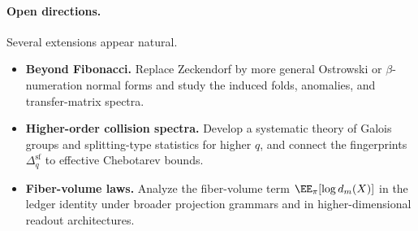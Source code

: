 \paragraph{Open directions.}
Several extensions appear natural.
\begin{itemize}[leftmargin=2.2em]
\item \textbf{Beyond Fibonacci.} Replace Zeckendorf by more general Ostrowski or \(\beta\)-numeration normal forms and study the induced folds, anomalies, and transfer-matrix spectra.
\item \textbf{Higher-order collision spectra.} Develop a systematic theory of Galois groups and splitting-type statistics for higher \(q\), and connect the fingerprints \(\Delta_q^{\mathrm{sf}}\) to effective Chebotarev bounds.
\item \textbf{Fiber-volume laws.} Analyze the fiber-volume term \(\EE_{\pi}[\log d_m(X)]\) in the ledger identity under broader projection grammars and in higher-dimensional readout architectures.
\end{itemize}

